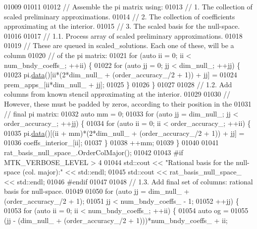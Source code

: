 \begin{DoxyCode}
{{01009 
01011 
01012   \textcolor{comment}{// Assemble the pi matrix using:}
01013   \textcolor{comment}{// 1. The collection of scaled preliminary approximations.}
01014   \textcolor{comment}{// 2. The collection of coefficients approximating at the interior.}
01015   \textcolor{comment}{// 3. The scaled basis for the null-space.}
01016 
01017   \textcolor{comment}{// 1.1. Process array of scaled preliminary approximations.}
01018 
01019   \textcolor{comment}{// These are queued in scaled\_solutions. Each one of these, will be a column}
01020   \textcolor{comment}{// of the pi matrix:}
01021   \textcolor{keywordflow}{for} (\textcolor{keyword}{auto} ii = 0; ii < num\_bndy\_coeffs\_; ++ii) \{
01022     \textcolor{keywordflow}{for} (\textcolor{keyword}{auto} jj = 0; jj < dim\_null\_; ++jj) \{
01023       pi.\hyperlink{classmtk_1_1DenseMatrix_a0c33b8a9e01d157c61ddbdf807c25d84}{data}()[ii*(2*dim\_null\_ + (order\_accuracy\_/2 + 1)) + jj] =
01024         prem\_apps\_[ii*dim\_null\_ + jj];
01025     \}
01026   \}
01027 
01028   \textcolor{comment}{// 1.2. Add columns from known stencil approximating at the interior.}
01029 
01030   \textcolor{comment}{// However, these must be padded by zeros, according to their position in the}
01031   \textcolor{comment}{// final pi matrix:}
01032   \textcolor{keyword}{auto} mm = 0;
01033   \textcolor{keywordflow}{for} (\textcolor{keyword}{auto} jj = dim\_null\_; jj < order\_accuracy\_; ++jj) \{
01034     \textcolor{keywordflow}{for} (\textcolor{keyword}{auto} ii = 0; ii < order\_accuracy\_; ++ii) \{
01035       pi.\hyperlink{classmtk_1_1DenseMatrix_a0c33b8a9e01d157c61ddbdf807c25d84}{data}()[(ii + mm)*(2*dim\_null\_ + (order\_accuracy\_/2 + 1)) + jj] =
01036         coeffs\_interior\_[ii];
01037     \}
01038     ++mm;
01039   \}
01040 
01041   rat\_basis\_null\_space\_.OrderColMajor();
01042 
01043 \textcolor{preprocessor}{  #if MTK\_VERBOSE\_LEVEL > 4}
01044   std::cout << \textcolor{stringliteral}{"Rational basis for the null-space (col. major):"} << std::endl;
01045   std::cout << rat\_basis\_null\_space\_ << std::endl;
01046 \textcolor{preprocessor}{  #endif}
01047 
01048   \textcolor{comment}{// 1.3. Add final set of columns: rational basis for null-space.}
01049 
01050   \textcolor{keywordflow}{for} (\textcolor{keyword}{auto} jj = dim\_null\_ + (order\_accuracy\_/2 + 1);
01051        jj < num\_bndy\_coeffs\_ - 1;
01052        ++jj) \{
01053     \textcolor{keywordflow}{for} (\textcolor{keyword}{auto} ii = 0; ii < num\_bndy\_coeffs\_; ++ii) \{
01054       \textcolor{keyword}{auto} og =
01055         (jj - (dim\_null\_ + (order\_accuracy\_/2 + 1)))*num\_bndy\_coeffs\_ + ii;
}}
\end{DoxyCode}
